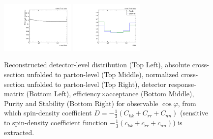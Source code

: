 \begin{figure}[htb]
\begin{center}
 \includegraphics[width=0.32\textwidth]{fig_fullRun2UL/unfolding/combined/TotEff_ll_cHel.pdf}
 \includegraphics[width=0.32\textwidth]{fig_fullRun2UL/unfolding/combined/PurStab_ll_cHel.pdf} \\
\caption{Reconstructed detector-level distribution (Top Left), absolute cross-section unfolded to parton-level (Top Middle), normalized cross-section unfolded to parton-level (Top Right), detector response-matrix (Bottom Left), efficiency$\times$acceptance (Bottom Middle), Purity and Stability (Bottom Right) for  observable $\cos\varphi$, from which spin-density coefficient $D = -\frac{1}{3}(C_{kk} + C_{rr} + C_{nn})$ (sensitive to spin-density coefficient function $-\frac{1}{3}(c_{kk} + c_{rr} + c_{nn})$) is extracted.}
\label{fig:ll_cHel}
\end{center}
\end{figure}
\clearpage
